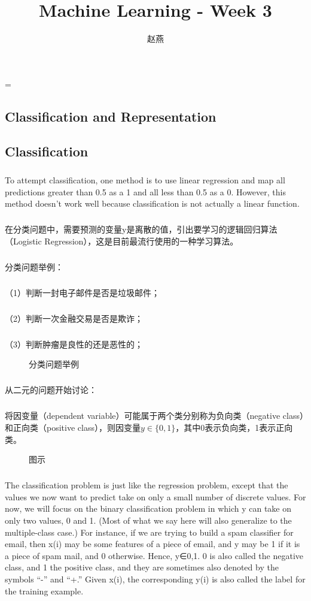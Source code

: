 \documentclass{article}
\title{Machine Learning - Week 3}
\author{赵燕}
\date{}
\begin{document}
 
\hfuzz=\maxdimen
{}
\begin{CJK}{UTF8}{gbsn} 
\maketitle
\renewcommand\contentsname{目录}
\renewcommand\figurename{图}
\tableofcontents
\newpage

\section{Classification and Representation}
\subsection{Classification}
\subparagraph{}
To attempt classification, one method is to use linear regression and map all predictions greater than 0.5 as a 1 and all less than 0.5 as a 0. However, this method doesn't work well because classification is not actually a linear function.
\subparagraph{}
在分类问题中，需要预测的变量y是离散的值，引出要学习的逻辑回归算法（Logistic Regression），这是目前最流行使用的一种学习算法。
\subparagraph{}
分类问题举例：
\subparagraph{}
（1）判断一封电子邮件是否是垃圾邮件；
\subparagraph{}
（2）判断一次金融交易是否是欺诈；
\subparagraph{}
（3）判断肿瘤是良性的还是恶性的；
\begin{figure}[H]
\caption{分类问题举例}
\label{fig:301}
\end{figure}
\subparagraph{}
从二元的问题开始讨论：
\subparagraph{}
将因变量（dependent variable）可能属于两个类分别称为负向类（negative class）和正向类（positive class），则因变量$y\in{\{0,1}\}$，其中0表示负向类，1表示正向类。
\begin{figure}[H]
\caption{图示}
\label{fig:302}
\end{figure}
\subparagraph{}
The classification problem is just like the regression problem, except that the values we now want to predict take on only a small number of discrete values. For now, we will focus on the binary classification problem in which y can take on only two values, 0 and 1. (Most of what we say here will also generalize to the multiple-class case.) For instance, if we are trying to build a spam classifier for email, then x(i) may be some features of a piece of email, and y may be 1 if it is a piece of spam mail, and 0 otherwise. Hence, y∈{0,1}. 0 is also called the negative class, and 1 the positive class, and they are sometimes also denoted by the symbols “-” and “+.” Given x(i), the corresponding y(i) is also called the label for the training example.

\end{CJK}
\end{document}
